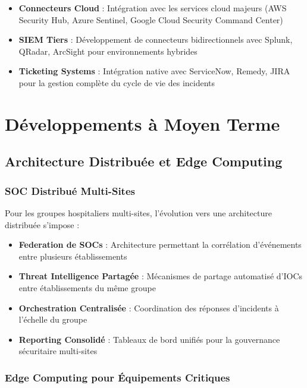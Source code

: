 \begin{itemize}
    \item \textbf{Connecteurs Cloud} : Intégration avec les services cloud majeurs (AWS Security Hub, Azure Sentinel, Google Cloud Security Command Center)
    \item \textbf{SIEM Tiers} : Développement de connecteurs bidirectionnels avec Splunk, QRadar, ArcSight pour environnements hybrides
    \item \textbf{Ticketing Systems} : Intégration native avec ServiceNow, Remedy, JIRA pour la gestion complète du cycle de vie des incidents
\end{itemize}

\section{Développements à Moyen Terme}

\subsection{Architecture Distribuée et Edge Computing}

\subsubsection{SOC Distribué Multi-Sites}

Pour les groupes hospitaliers multi-sites, l'évolution vers une architecture distribuée s'impose :

\begin{itemize}
    \item \textbf{Federation de SOCs} : Architecture permettant la corrélation d'événements entre plusieurs établissements
    \item \textbf{Threat Intelligence Partagée} : Mécanismes de partage automatisé d'IOCs entre établissements du même groupe
    \item \textbf{Orchestration Centralisée} : Coordination des réponses d'incidents à l'échelle du groupe
    \item \textbf{Reporting Consolidé} : Tableaux de bord unifiés pour la gouvernance sécuritaire multi-sites
\end{itemize}

\subsubsection{Edge Computing pour Équipements Critiques}

